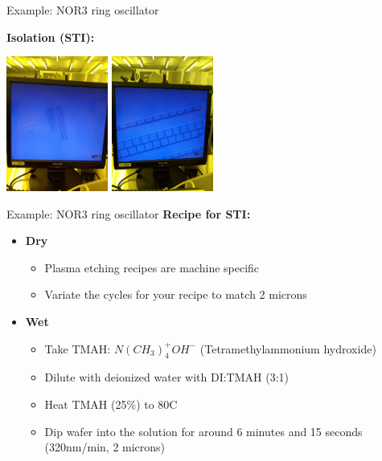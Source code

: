 \documentclass[aspectratio=169]{beamer}
\begin{document}
\begin{frame}{Example: NOR3 ring oscillator}
\begin{center}
	\textbf{Isolation (STI):}

	\includegraphics[width=0.25\textwidth]{images/20181219_125354_Burst01.jpg}
	\includegraphics[width=0.25\textwidth]{images/20181219_125758.jpg}
\end{center}
\end{frame}

\begin{frame}{Example: NOR3 ring oscillator}
	\textbf{Recipe for STI:}
	\begin{itemize}
		\item\textbf{Dry}
		\begin{itemize}
			\item Plasma etching recipes are machine specific
			\item Variate the cycles for your recipe to match 2 microns
		\end{itemize}
		\item\textbf{Wet}
		\begin{itemize}
			\item Take TMAH: $ N ( CH _3 ) _4 ^{+} OH ^{−}$ (Tetramethylammonium hydroxide)
			\item Dilute with deionized water with DI:TMAH (3:1)
			\item Heat TMAH (25\%) to 80\textdegree{}C
			\item Dip wafer into the solution for around 6 minutes and 15 seconds (320nm/min, 2 microns)
		\end{itemize}
	\end{itemize}
\end{frame}
\end{document}

